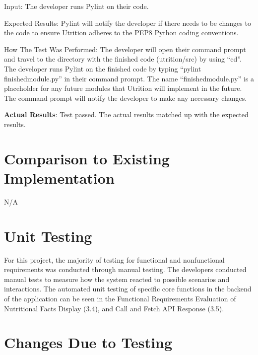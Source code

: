 \documentclass[12pt, titlepage]{article}
\begin{document}
\begin{enumerate}
		Input: The developer runs Pylint on their code.
		
		Expected Results: Pylint will notify the developer if there needs to be changes to the code to ensure Utrition adheres to the PEP8 Python coding conventions.
		
		How The Test Was Performed: The developer will open their command prompt and travel to the directory with the finished code (utrition/src) by using “cd”. The developer runs Pylint on the finished code by typing “pylint finishedmodule.py” in their command prompt. The name “finishedmodule.py” is a placeholder for any future modules that Utrition will implement in the future. The command prompt will notify the developer to make any necessary changes.
		
		\textbf{Actual Results}: Test passed. The actual results matched up with the expected results.
		
		
	\end{enumerate}
	
	\section{Comparison to Existing Implementation}	
	
	N/A
	
	\section{Unit Testing}
	
	For this project, the majority of testing for functional and nonfunctional requirements was conducted through manual testing. The developers conducted manual tests to measure how the system reacted to possible scenarios and interactions. The automated unit testing of specific core functions in the backend of the application can be seen in the Functional Requirements Evaluation of Nutritional Facts Display (3.4), and Call and Fetch API Response (3.5).
	
	\section{Changes Due to Testing}
\end{document}
